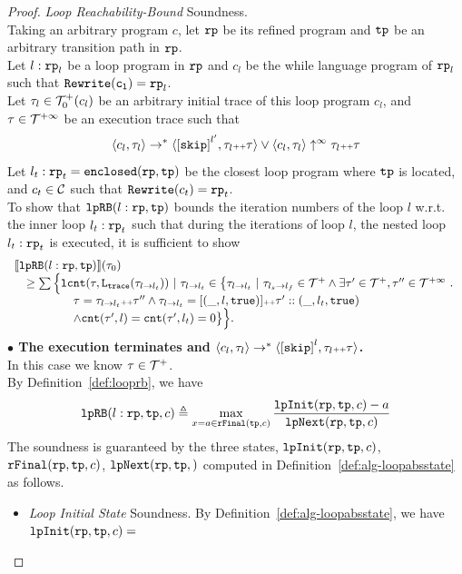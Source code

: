   \begin{proof}
  \label{proof:looprb-sound}
    \emph{Loop Reachability-Bound} Soundness.
    \\
    Taking an arbitrary program $c$, let $\mathtt{rp}$ be its refined program and $\mathtt{tp}$ be an arbitrary transition path in $\mathtt{rp}$.
    \\
    Let $l: \mathtt{rp}_l$ be a loop program in $\mathtt{rp}$ and $c_l$ be the while language program of $\mathtt{rp}_l$ such that $\mathtt{Rewrite(c_l)} = \mathtt{rp}_l$. 
    \\
    Let $\mathtt{\tau}_l \in \mathcal{T}^{+}_0(c_l)$ be an arbitrary initial trace of this loop program $c_l$, and $\mathtt{\tau} \in \mathcal{T}^{+\infty} $ be an execution trace such that
    \[
      \config{c_l, \trace_l} \to^* \config{\clabel{\eskip}^{l'}, \trace_l \tracecat \trace} \lor \config{c_l, \trace_l} \uparrow^{\infty} \trace_l \tracecat \trace 
    \]
    Let  $l_t: \mathtt{rp}_t = \mathtt{enclosed}(\mathtt{rp}, \mathtt{tp})$ be the closest loop program where $\mathtt{tp}$ is located,
  and $c_t \in \mathcal{C}$ such that $\mathtt{Rewrite}(c_t) = \mathtt{rp}_t$.
  \\
  To show that $\mathtt{lpRB}(l: \mathtt{rp}, \mathtt{tp})$ bounds the iteration numbers of the loop $l$ w.r.t.
  the inner loop $l_t: \mathtt{rp}_t$ such that during the iterations of loop $l$, the nested loop $l_t: \mathtt{rp}_t$ is executed, it is sufficient to show
    \[
      \begin{array}{l}
        \llbracket \mathtt{lpRB}(l: \mathtt{rp}, \mathtt{tp}) \rrbracket(\mathtt{\tau}_0) 
        \\ \quad\geq 
        \sum\Big\{
            \mathtt{lcnt}(\mathtt{\tau}, \mathtt{L}_{\mathtt{{trace}}}(\mathtt{\tau}_{l \to l_t})) ~\vert~ \mathtt{\tau}_{l \to l_t} \in 
            \big\{\mathtt{\tau}_{l \to l_t} 
            ~\vert~ \mathtt{\tau}_{l_s \to l_f}\in \mathcal{T}^{+} 
            \land \exists  \mathtt{\tau}' \in \mathcal{T}^{+}, \mathtt{\tau}''\in \mathcal{T}^{+\infty}
            ~.~ 
            \\ \quad\qquad \qquad
            \mathtt{\tau} = \mathtt{\tau}_{l \to l_t} {\scriptscriptstyle ++} \mathtt{\tau}''
            \land \mathtt{\tau}_{l \to l_t} = [(\_, l, \mathtt{true})] {\scriptscriptstyle ++} \mathtt{\tau}' :: (\_, l_t, \mathtt{true})
            \\ \quad\qquad \qquad
            \land \mathtt{cnt}(\mathtt{\tau}', l) = \mathtt{cnt}(\mathtt{\tau}', l_t) = 0 
            \big\}
          \Big\}.
    \end{array}
    \]
\textbf{$\bullet$ The execution terminates and {$\config{{c_l}, \trace_l} \to^{*} \config{\clabel{\eskip}^{l}, \trace_l \tracecat \trace}$}.} 
    \\
  In this case we know $\mathtt{\tau} \in \mathcal{T}^{+}$. 
  \\
By Definition~\ref{def:looprb}, we have
\[
  \mathtt{lpRB}(l: \mathtt{rp}, \mathtt{tp}, c) \triangleq
  \max\limits_{x = a \in \mathtt{rFinal}(\mathtt{tp}, c)}
  \frac{\mathtt{lpInit}(\mathtt{rp}, \mathtt{tp}, c) - a }{\mathtt{lpNext}(\mathtt{rp}, \mathtt{tp}, c)}
\]
The soundness is guaranteed by the three states,
 $\mathtt{lpInit}(\mathtt{rp}, \mathtt{tp}, c)$, $\mathtt{rFinal}(\mathtt{rp}, \mathtt{tp}, c)$, $\mathtt{lpNext}(\mathtt{rp}, \mathtt{tp}, )$ computed in Definition~\ref{def:alg-loopabsstate} as follows.
\begin{itemize}
  \item \emph{Loop Initial State} Soundness.
  By Definition~\ref{def:alg-loopabsstate}, we have $\mathtt{lpInit}(\mathtt{rp}, \mathtt{tp}, c) = $ 
  

\end{itemize}
\end{proof}
